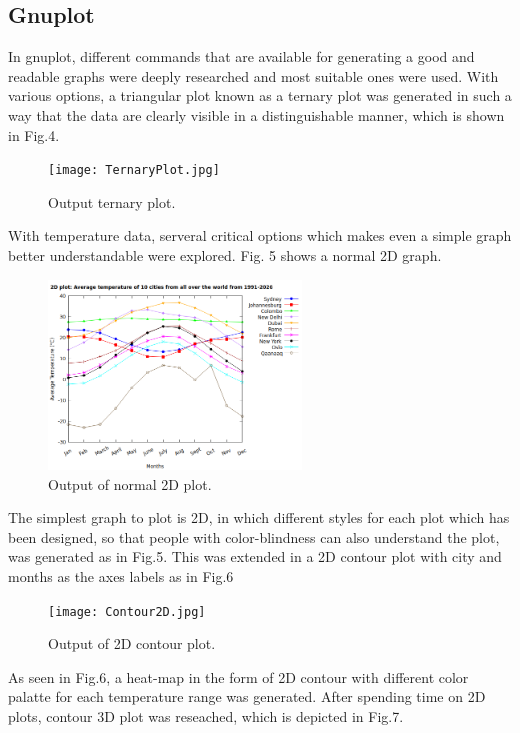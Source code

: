 \documentclass[runningheads]{llncs}
\begin{document}
\subsection{Gnuplot}
In gnuplot, different commands that are available for generating a good and readable graphs were deeply researched and most suitable ones were used. With various options, a triangular plot known as a ternary plot was generated in such a way that the data are clearly visible in a distinguishable manner, which is shown in Fig.4.

\begin{figure}[H]
    \centering
    \texttt{[image: TernaryPlot.jpg]}
    \caption{Output ternary plot.}
\end{figure}

With temperature data, serveral critical options which makes even a simple graph better understandable were explored. Fig. 5 shows a normal 2D graph.  

\begin{figure}[H]
    \centering
    \includegraphics[width=0.6\textwidth]{Normal2D.jpg}
    \caption{Output of normal 2D plot.}
\end{figure}

The simplest graph to plot is 2D, in which different styles for each plot which has been designed, so that people with color-blindness can also understand the plot, was generated as in Fig.5. This was extended in a 2D contour plot with city and months as the axes labels as in Fig.6

\begin{figure}[H]
    \centering
    \texttt{[image: Contour2D.jpg]}
    \caption{Output of 2D contour plot.}
\end{figure}

As seen in Fig.6, a heat-map in the form of 2D contour with different color palatte for each temperature range was generated. After spending time on 2D plots, contour 3D plot was reseached, which is depicted in Fig.7.
\end{document}
